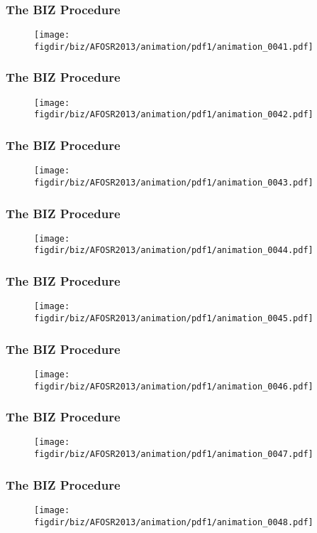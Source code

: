 \documentclass[13pt]{beamer}
\newcommand{\figdir}{../../fig}
\begin{document}
\begin{frame}\frametitle{The BIZ Procedure}\begin{figure}\texttt{[image: \\figdir/biz/AFOSR2013/animation/pdf1/animation\_0041.pdf]}\end{figure}\end{frame}
\begin{frame}\frametitle{The BIZ Procedure}\begin{figure}\texttt{[image: \\figdir/biz/AFOSR2013/animation/pdf1/animation\_0042.pdf]}\end{figure}\end{frame}
\begin{frame}\frametitle{The BIZ Procedure}\begin{figure}\texttt{[image: \\figdir/biz/AFOSR2013/animation/pdf1/animation\_0043.pdf]}\end{figure}\end{frame}
\begin{frame}\frametitle{The BIZ Procedure}\begin{figure}\texttt{[image: \\figdir/biz/AFOSR2013/animation/pdf1/animation\_0044.pdf]}\end{figure}\end{frame}
\begin{frame}\frametitle{The BIZ Procedure}\begin{figure}\texttt{[image: \\figdir/biz/AFOSR2013/animation/pdf1/animation\_0045.pdf]}\end{figure}\end{frame}
\begin{frame}\frametitle{The BIZ Procedure}\begin{figure}\texttt{[image: \\figdir/biz/AFOSR2013/animation/pdf1/animation\_0046.pdf]}\end{figure}\end{frame}
\begin{frame}\frametitle{The BIZ Procedure}\begin{figure}\texttt{[image: \\figdir/biz/AFOSR2013/animation/pdf1/animation\_0047.pdf]}\end{figure}\end{frame}
\begin{frame}\frametitle{The BIZ Procedure}\begin{figure}\texttt{[image: \\figdir/biz/AFOSR2013/animation/pdf1/animation\_0048.pdf]}\end{figure}\end{frame}
\end{document}
